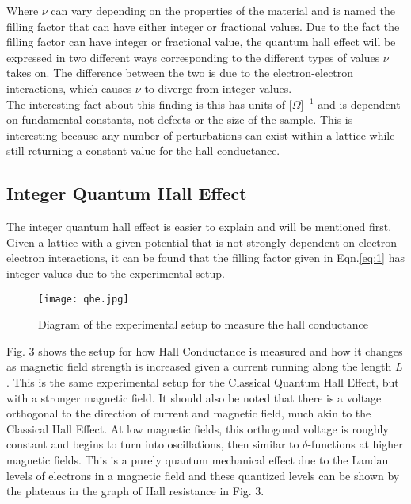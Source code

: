 \documentclass[14pt]{article}
\begin{document}
Where $\nu$ can vary depending on the properties of the material and is named the filling factor that can have either integer or fractional values. Due to the fact the filling factor can have integer or fractional value, the quantum hall effect will be expressed in two different ways corresponding to the different types of values $\nu$ takes on. The difference between the two is due to the electron-electron interactions, which causes $\nu$ to diverge from integer values\cite{kittel}.\\

The interesting fact about this finding is this has units of [$\Omega$]$^{-1}$ and is dependent on fundamental constants, not defects or the size of the sample. This is interesting because any number of perturbations can exist within a lattice while still returning a constant value for the hall conductance\cite{qhe talk}.

\subsection*{Integer Quantum Hall Effect}

The integer quantum hall effect is easier to explain and will be mentioned first. Given a lattice with a given potential that is not strongly dependent on electron-electron interactions, it can be found that the filling factor given in Eqn.\eqref{eq:1} has integer values due to the experimental setup.\\

\begin{figure}[ht]
	\centering
	\texttt{[image: qhe.jpg]}
	\label{fig:sheet2}
	\caption{Diagram of the experimental setup to measure the hall conductance\cite{setup}}
\end{figure}

Fig. 3 shows the setup for how Hall Conductance is measured and how it changes as magnetic field strength is increased given a current running along the length $L$. This is the same experimental setup for the Classical Quantum Hall Effect, but with a stronger magnetic field. It should also be noted that there is a voltage orthogonal to the direction of current and magnetic field, much akin to the Classical Hall Effect. At low magnetic fields, this orthogonal voltage is roughly constant and begins to turn into oscillations, then similar to $\delta$-functions at higher magnetic fields. This is a purely quantum mechanical effect due to the Landau levels of electrons in a magnetic field and these quantized levels can be shown by the plateaus in the graph of Hall resistance in Fig. 3.\cite{qhe talk}\\
\end{document}
